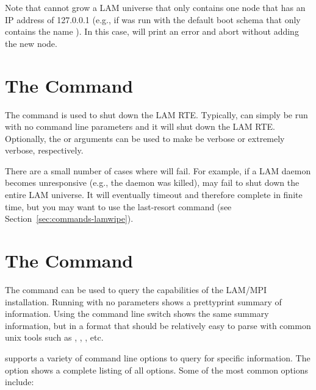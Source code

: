 Note that  cannot grow a LAM universe that only contains
one node that has an IP address of 127.0.0.1 (e.g., if 
was run with the default boot schema that only contains the name
).  In this case,  will print an error
and abort without adding the new node.


\section{The  Command}
\label{sec:commands-lamhalt}

The  command is used to shut down the LAM RTE.
Typically,  can simply be run with no command line
parameters and it will shut down the LAM RTE.  Optionally, the
 or  arguments can be used to make 
be verbose or extremely verbose, respectively.

There are a small number of cases where  will fail.  For
example, if a LAM daemon becomes unresponsive (e.g., the daemon was
killed),  may fail to shut down the entire LAM universe.
It will eventually timeout and therefore complete in finite time, but
you may want to use the last-resort  command (see
Section~\ref{sec:commands-lamwipe}).


\section{The  Command}
\label{sec:commands-laminfo}

The  command can be used to query the capabilities of the
LAM/MPI installation.  Running  with no parameters shows
a prettyprint summary of information.  Using the 
command line switch shows the same summary information, but in a
format that should be relatively easy to parse with common unix tools
such as , , , etc.

 supports a variety of command line options to query for
specific information.  The  option shows a complete listing
of all options.  Some of the most common options include:

